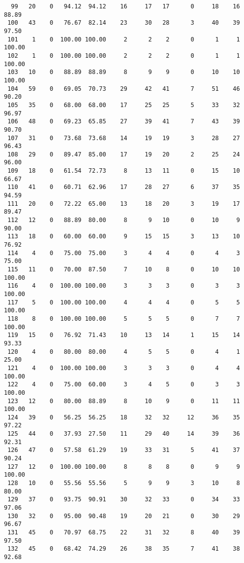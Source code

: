 \begin{verbatim}
  99   20    0   94.12  94.12    16     17   17      0     18    16    88.89
 100   43    0   76.67  82.14    23     30   28      3     40    39    97.50
 101    1    0  100.00 100.00     2      2    2      0      1     1   100.00
 102    1    0  100.00 100.00     2      2    2      0      1     1   100.00
 103   10    0   88.89  88.89     8      9    9      0     10    10   100.00
 104   59    0   69.05  70.73    29     42   41      7     51    46    90.20
 105   35    0   68.00  68.00    17     25   25      5     33    32    96.97
 106   48    0   69.23  65.85    27     39   41      7     43    39    90.70
 107   31    0   73.68  73.68    14     19   19      3     28    27    96.43
 108   29    0   89.47  85.00    17     19   20      2     25    24    96.00
 109   18    0   61.54  72.73     8     13   11      0     15    10    66.67
 110   41    0   60.71  62.96    17     28   27      6     37    35    94.59
 111   20    0   72.22  65.00    13     18   20      3     19    17    89.47
 112   12    0   88.89  80.00     8      9   10      0     10     9    90.00
 113   18    0   60.00  60.00     9     15   15      3     13    10    76.92
 114    4    0   75.00  75.00     3      4    4      0      4     3    75.00
 115   11    0   70.00  87.50     7     10    8      0     10    10   100.00
 116    4    0  100.00 100.00     3      3    3      0      3     3   100.00
 117    5    0  100.00 100.00     4      4    4      0      5     5   100.00
 118    8    0  100.00 100.00     5      5    5      0      7     7   100.00
 119   15    0   76.92  71.43    10     13   14      1     15    14    93.33
 120    4    0   80.00  80.00     4      5    5      0      4     1    25.00
 121    4    0  100.00 100.00     3      3    3      0      4     4   100.00
 122    4    0   75.00  60.00     3      4    5      0      3     3   100.00
 123   12    0   80.00  88.89     8     10    9      0     11    11   100.00
 124   39    0   56.25  56.25    18     32   32     12     36    35    97.22
 125   44    0   37.93  27.50    11     29   40     14     39    36    92.31
 126   47    0   57.58  61.29    19     33   31      5     41    37    90.24
 127   12    0  100.00 100.00     8      8    8      0      9     9   100.00
 128   10    0   55.56  55.56     5      9    9      3     10     8    80.00
 129   37    0   93.75  90.91    30     32   33      0     34    33    97.06
 130   32    0   95.00  90.48    19     20   21      0     30    29    96.67
 131   45    0   70.97  68.75    22     31   32      8     40    39    97.50
 132   45    0   68.42  74.29    26     38   35      7     41    38    92.68

\end{verbatim}
